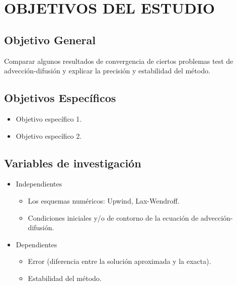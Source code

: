 \section{OBJETIVOS DEL ESTUDIO}
\subsection{Objetivo General}

Comparar algunos resultados de convergencia de ciertos problemas
test de advección-difusión y explicar la precisión y estabilidad del método.

\subsection{Objetivos Específicos}
\begin{itemize}
	\item Objetivo específico 1.

	\item Objetivo específico 2.
\end{itemize}

\subsection{Variables de investigación}

\begin{itemize}
	\item Independientes

	      \begin{itemize}
		      \item Los esquemas numéricos: Upwind, Lax-Wendroff.
		      \item Condiciones iniciales y/o de contorno de la ecuación de advección-difusión.
	      \end{itemize}

	\item Dependientes
	      \begin{itemize}
		      \item Error (diferencia entre la solución aproximada y la exacta).
		      \item Estabilidad del método.
	      \end{itemize}
\end{itemize}